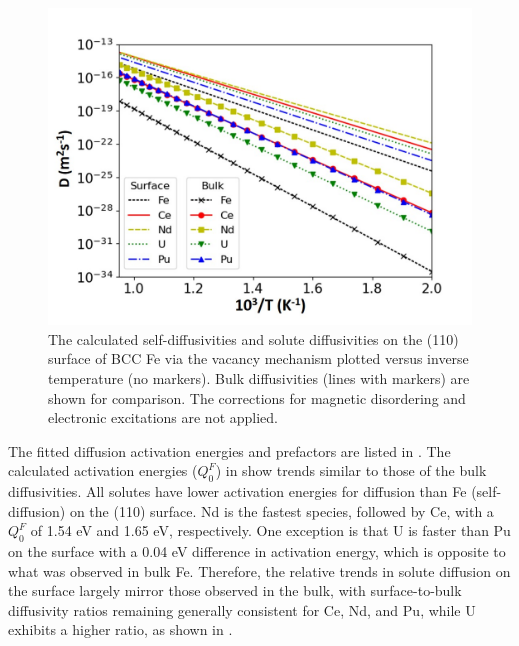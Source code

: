 \documentclass[preprint,12pt]{elsarticle}
\begin{document}
\begin{figure}[!ht]
    \centering
    \includegraphics[width=0.8\linewidth]{surface_diff.jpg}
    \caption{The calculated self-diffusivities and solute diffusivities on the (110) surface of BCC Fe via the vacancy mechanism plotted versus inverse temperature (no markers). Bulk diffusivities (lines with markers) are shown for comparison. The corrections for magnetic disordering and electronic excitations are not applied.}
    \label{fig:diff_surface}
\end{figure}

The fitted diffusion activation energies and prefactors are listed in . The calculated activation energies ($Q_0^F$) in  show trends similar to those of the bulk diffusivities. All solutes have lower activation energies for diffusion than Fe (self-diffusion) on the (110) surface. Nd is the fastest species, followed by Ce, with a $Q_0^F$ of 1.54 eV and 1.65 eV, respectively. One exception is that U is faster than Pu on the surface with a 0.04 eV difference in activation energy, which is opposite to what was observed in bulk Fe. Therefore, the relative trends in solute diffusion on the surface largely mirror those observed in the bulk, with surface-to-bulk diffusivity ratios remaining generally consistent for Ce, Nd, and Pu, while U exhibits a higher ratio, as shown in .

\end{document}
